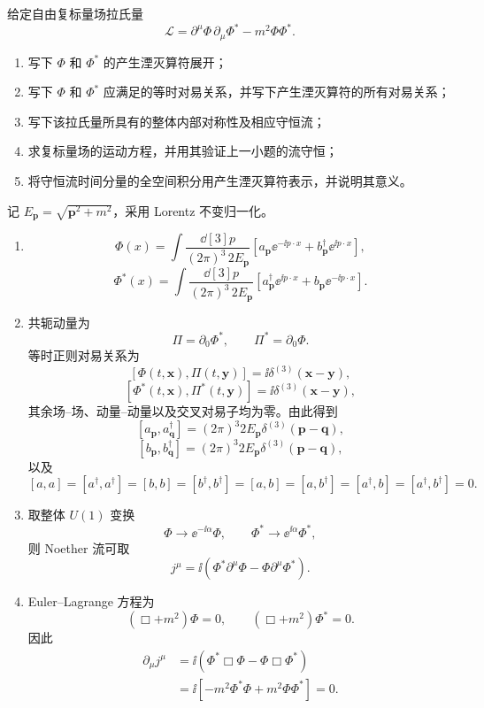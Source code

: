\begin{question}[25 分]
给定自由复标量场拉氏量
\[
\mathcal L=\partial^\mu\Phi\,\partial_\mu\Phi^*-m^2\Phi\Phi^*.
\]
\begin{enumerate}
  \item 写下 $\Phi$ 和 $\Phi^*$ 的产生湮灭算符展开；
  \item 写下 $\Phi$ 和 $\Phi^*$ 应满足的等时对易关系，并写下产生湮灭算符的所有对易关系；
  \item 写下该拉氏量所具有的整体内部对称性及相应守恒流；
  \item 求复标量场的运动方程，并用其验证上一小题的流守恒；
  \item 将守恒流时间分量的全空间积分用产生湮灭算符表示，并说明其意义。
\end{enumerate}
\begin{solution}
记 $E_{\mathbf p}=\sqrt{\mathbf p^2+m^2}$，采用 Lorentz 不变归一化。
\begin{enumerate}
  \item
  \[
  \boxed{
  \Phi(x)=\int\frac{\dd[3]{p}}{(2\pi)^3\,2E_{\mathbf p}}
  \left[a_{\mathbf p}\ee^{-\ii p\cdot x}+b_{\mathbf p}^\dagger\ee^{\ii p\cdot x}\right]},
  \]
  \[
  \boxed{
  \Phi^*(x)=\int\frac{\dd[3]{p}}{(2\pi)^3\,2E_{\mathbf p}}
  \left[a_{\mathbf p}^\dagger\ee^{\ii p\cdot x}+b_{\mathbf p}\ee^{-\ii p\cdot x}\right]}.
  \]

  \item 共轭动量为
  \[
  \Pi=\partial_0\Phi^*,\qquad \Pi^*=\partial_0\Phi.
  \]
  等时正则对易关系为
  \[
  [\Phi(t,\mathbf x),\Pi(t,\mathbf y)]=\ii\delta^{(3)}(\mathbf x-\mathbf y),
  \]
  \[
  [\Phi^*(t,\mathbf x),\Pi^*(t,\mathbf y)]=\ii\delta^{(3)}(\mathbf x-\mathbf y),
  \]
  其余场--场、动量--动量以及交叉对易子均为零。由此得到
  \[
  \boxed{[a_{\mathbf p},a_{\mathbf q}^\dagger]
  =(2\pi)^3 2E_{\mathbf p}\delta^{(3)}(\mathbf p-\mathbf q)},
  \]
  \[
  \boxed{[b_{\mathbf p},b_{\mathbf q}^\dagger]
  =(2\pi)^3 2E_{\mathbf p}\delta^{(3)}(\mathbf p-\mathbf q)},
  \]
  以及
  \[
  [a,a]=[a^\dagger,a^\dagger]=[b,b]=[b^\dagger,b^\dagger]
  =[a,b]=[a,b^\dagger]=[a^\dagger,b]=[a^\dagger,b^\dagger]=0.
  \]

  \item 取整体 $U(1)$ 变换
  \[
  \Phi\to\ee^{-\ii\alpha}\Phi,
  \qquad
  \Phi^*\to\ee^{\ii\alpha}\Phi^*,
  \]
  则 Noether 流可取
  \[
  \boxed{j^\mu=\ii\left(\Phi^*\partial^\mu\Phi-\Phi\partial^\mu\Phi^*\right)}.
  \]

  \item Euler--Lagrange 方程为
  \[
  \boxed{(\Box+m^2)\Phi=0},\qquad
  \boxed{(\Box+m^2)\Phi^*=0}.
  \]
  因此
  \[
  \begin{aligned}
  \partial_\mu j^\mu
  &=\ii\left(\Phi^*\Box\Phi-\Phi\Box\Phi^*\right)\\
  &=\ii\left[-m^2\Phi^*\Phi+m^2\Phi\Phi^*\right]=0.
  \end{aligned}
  \]


\end{enumerate}
\end{solution}
\end{question}
